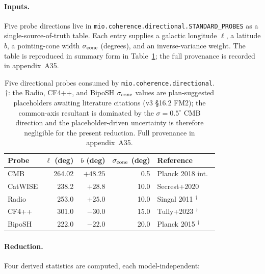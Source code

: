 \paragraph{Inputs.}

Five probe directions live in
\texttt{mio.coherence.directional.STANDARD\_PROBES} as a
single-source-of-truth table.  Each entry supplies a
galactic longitude $\ell$, a latitude $b$, a pointing-cone
width $\sigma_{\rm cone}$ (degrees), and an inverse-variance
weight.  The table is reproduced in summary form in
Table~\ref{tab:mio-probes}; the full provenance is recorded
in appendix~A35.

\begin{table}[h]
\centering
\setlength{\tabcolsep}{5pt}
\small
\begin{tabular}{lrrrl}
\hline\hline
Probe & $\ell$ (deg) & $b$ (deg) & $\sigma_{\rm cone}$ (deg)
      & Reference \\
\hline
CMB      & 264.02 & $+48.25$ & 0.5  & Planck 2018 int.\ \\
CatWISE  & 238.2  & $+28.8$  & 10.0 & Secrest+2020 \\
Radio    & 253.0  & $+25.0$  & 10.0 & Singal 2011 $^\dagger$ \\
CF4++    & 301.0  & $-30.0$  & 15.0 & Tully+2023 $^\dagger$ \\
BipoSH   & 222.0  & $-22.0$  & 20.0 & Planck 2015 $^\dagger$ \\
\hline\hline
\end{tabular}
\caption{Five directional probes consumed by
\texttt{mio.coherence.directional}.  $\dagger$: the Radio,
CF4++, and BipoSH $\sigma_{\rm cone}$ values are plan-suggested
placeholders awaiting literature citations (v3 §16.2 FM2);
the common-axis resultant is dominated by the $\sigma=0.5^\circ$
CMB direction and the placeholder-driven uncertainty is
therefore negligible for the present reduction.  Full
provenance in appendix~A35.}
\label{tab:mio-probes}
\end{table}

\paragraph{Reduction.}

Four derived statistics are computed, each model-independent:

